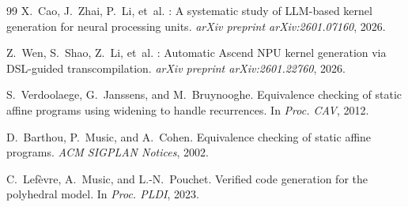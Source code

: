 \documentclass[sigconf]{acmart}
\begin{document}
\begin{thebibliography}{99}
X.~Cao, J.~Zhai, P.~Li, et~al.
: A systematic study of {LLM}-based kernel generation for neural processing units.
\newblock \emph{arXiv preprint arXiv:2601.07160}, 2026.

Z.~Wen, S.~Shao, Z.~Li, et~al.
: Automatic {Ascend} {NPU} kernel generation via {DSL}-guided transcompilation.
\newblock \emph{arXiv preprint arXiv:2601.22760}, 2026.

S.~Verdoolaege, G.~Janssens, and M.~Bruynooghe.
\newblock Equivalence checking of static affine programs using widening to handle recurrences.
\newblock In \emph{Proc. CAV}, 2012.

D.~Barthou, P.~Music, and A.~Cohen.
\newblock Equivalence checking of static affine programs.
\newblock \emph{ACM SIGPLAN Notices}, 2002.

C.~Lef\`evre, A.~Music, and L.-N.~Pouchet.
\newblock Verified code generation for the polyhedral model.
\newblock In \emph{Proc. PLDI}, 2023.

\end{thebibliography}
\end{document}
